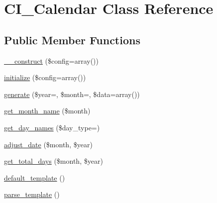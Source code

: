 \hypertarget{class_c_i___calendar}{}\section{C\+I\+\_\+\+Calendar Class Reference}
\label{class_c_i___calendar}
\subsection*{Public Member Functions}
\begin{DoxyCompactItemize}
\item 
\mbox{\hyperlink{class_c_i___calendar_a897a199c844ce2d4459e7b60ce8c766a}{\+\_\+\+\_\+construct}} (\$config=array())
\item 
\mbox{\hyperlink{class_c_i___calendar_a8b91781c18d53697a832d46ecbfeee37}{initialize}} (\$config=array())
\item 
\mbox{\hyperlink{class_c_i___calendar_ad2ca24684eb6f022811d268a759422bb}{generate}} (\$year=\textquotesingle{}\textquotesingle{}, \$month=\textquotesingle{}\textquotesingle{}, \$data=array())
\item 
\mbox{\hyperlink{class_c_i___calendar_a04de91e34b7318654e785e5cc1cc2fd3}{get\+\_\+month\+\_\+name}} (\$month)
\item 
\mbox{\hyperlink{class_c_i___calendar_a258986238b3db4eb98234b5a420150de}{get\+\_\+day\+\_\+names}} (\$day\+\_\+type=\textquotesingle{}\textquotesingle{})
\item 
\mbox{\hyperlink{class_c_i___calendar_aa059f059813fe8953253c64bad337cb0}{adjust\+\_\+date}} (\$month, \$year)
\item 
\mbox{\hyperlink{class_c_i___calendar_abcb093cef5b21da2b0e1bb63ef8d2ad0}{get\+\_\+total\+\_\+days}} (\$month, \$year)
\item 
\mbox{\hyperlink{class_c_i___calendar_acb35a5cb73ab69beb3bcaa3e28dfdb04}{default\+\_\+template}} ()
\item 
\mbox{\hyperlink{class_c_i___calendar_a8235db008796ae1a36c214575137fd79}{parse\+\_\+template}} ()
\end{DoxyCompactItemize}
